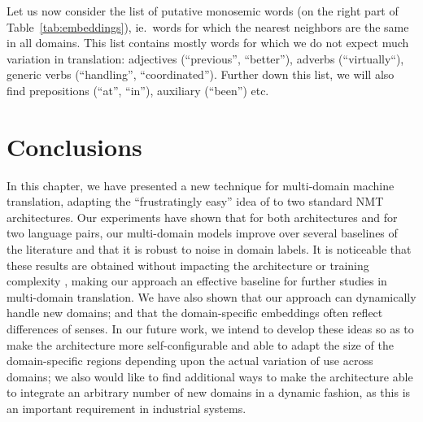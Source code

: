 Let us now consider the list of putative monosemic words (on the right part of Table~\ref{tab:embeddings}), ie.\ words for which the nearest neighbors are the same in all domains. This list contains mostly words for which we do not expect much variation in translation: adjectives (``previous'', ``better''), adverbs (``virtually``), generic verbs (``handling'', ``coordinated''). Further down this list, we will also find prepositions (``at'', ``in''), auxiliary (``been'') etc.  

\section{Conclusions}
In this chapter, we have presented a new technique for multi-domain machine translation,  adapting the ``frustratingly easy'' idea of \cite{Daume07frustratingly} to two standard NMT architectures. 
Our experiments have shown that for both architectures and for two language pairs, our multi-domain models improve over several baselines of the literature and that it is robust to noise in domain labels. 
It is noticeable that these results are obtained without impacting the architecture or training complexity
, making our approach an effective baseline for further studies in multi-domain translation.
We have also shown that our approach can dynamically handle new domains; and that the domain-specific embeddings often reflect differences of senses. In our future work, we intend to develop these ideas so as to make the architecture more self-configurable and able to adapt the size of the domain-specific regions depending upon the actual variation of use across domains; we also would like to find additional ways to make the architecture able to integrate an arbitrary number of new domains in a dynamic fashion, as this is an important requirement in industrial systems.

